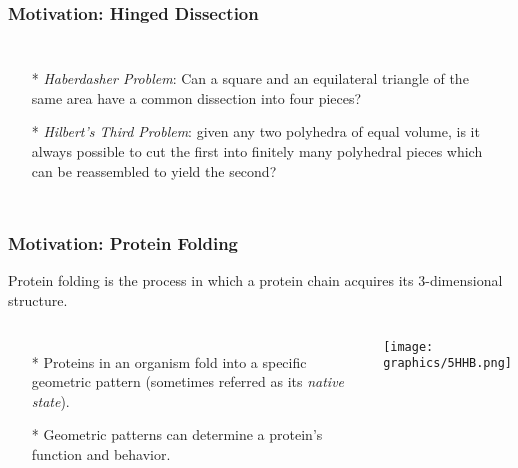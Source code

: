 \documentclass{beamer}
\begin{document}
\begin{frame}\frametitle{Motivation: Hinged Dissection}
    \begin{columns}[c]
        \begin{itemize}
            \item[*] \textit{Haberdasher Problem}: Can a square and an equilateral triangle of the same area have a common dissection into four pieces?
            \item[*]  \textit{Hilbert's Third Problem}: given any two polyhedra of equal volume, is it always possible to cut the first into finitely many polyhedral pieces which can be reassembled to yield the second?  
        \end{itemize}
  \begin{minipage}{\linewidth}
    \begin{center}
    \end{center}
  \end{minipage}
  \end{columns}
\end{frame}

\begin{frame}
  \frametitle{Motivation: Protein Folding}
  Protein folding is the process in which a protein chain acquires its 3-dimensional structure.
  \begin{columns}[c] 
   \begin{itemize}
    \item[*] Proteins in an organism fold into a specific geometric pattern (sometimes referred as its \textit{native state}).
    \item[*]  Geometric patterns can determine a protein's function and behavior.
   \end{itemize}
     \begin{minipage}{\linewidth}
        \begin{center}
        \texttt{[image: graphics/5HHB.png]}
        \end{center} 
  \end{minipage}
  \end{columns}
\end{frame}
\end{document}
